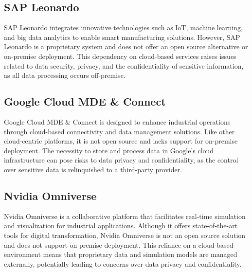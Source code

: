 \subsection{SAP Leonardo}
SAP Leonardo integrates innovative technologies such as IoT, machine learning, and big data analytics to enable smart manufacturing solutions. \cite{sap-2024} However, SAP Leonardo is a proprietary system and does not offer an open source alternative or on-premise deployment. This dependency on cloud-based services raises issues related to data security, privacy, and the confidentiality of sensitive information, as all data processing occurs off-premise.

\subsection{Google Cloud MDE \& Connect}
Google Cloud MDE \& Connect is designed to enhance industrial operations through cloud-based connectivity and data management solutions. \cite{rao-2024} Like other cloud-centric platforms, it is not open source and lacks support for on-premise deployment. The necessity to store and process data in Google’s cloud infrastructure can pose risks to data privacy and confidentiality, as the control over sensitive data is relinquished to a third-party provider.

\subsection{Nvidia Omniverse}
Nvidia Omniverse is a collaborative platform that facilitates real-time simulation and visualization for industrial applications. \cite{nvidia-2025} Although it offers state-of-the-art tools for digital transformation, Nvidia Omniverse is not an open source solution and does not support on-premise deployment. This reliance on a cloud-based environment means that proprietary data and simulation models are managed externally, potentially leading to concerns over data privacy and confidentiality.

